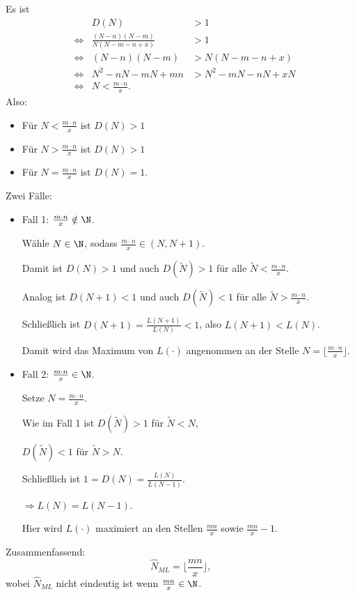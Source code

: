 \documentclass{tstextbook}
\begin{document}
\begin{example}
	Es ist 
	\[
	\begin{aligned}
		&& D(N) & > 1 \\
		& \Leftrightarrow & \frac{(N-n)(N-m)}{N(N-m-n+x)} & > 1 \\
		& \Leftrightarrow & (N-n)(N-m) & > N(N-m-n+x) \\
		& \Leftrightarrow & N^2-nN-mN+mn & > N^2-mN-nN+xN \\
		& \Leftrightarrow & N < \frac{m\cdot n}{x}.
	\end{aligned}
	\]
	Also: 
	\begin{itemize}
		\item Für $ N < \frac{m\cdot n}{x} $ ist $ D(N) > 1 $
		\item Für $ N > \frac{m\cdot n}{x} $ ist $ D(N) > 1 $
		\item Für $ N = \frac{m\cdot n}{x} $ ist $ D(N) = 1 $.
	\end{itemize}

Zwei Fälle:
	\begin{itemize}
		\item Fall 1: 
		$ \frac{m\cdot n}{x}\notin \N $. 
		
		Wähle $ N \in \N $, sodass $ \frac{m\cdot n}{x} \in (N, N+1) $. 
		
		Damit ist $ D(N) > 1 $ und auch $ D(\tilde{N}) > 1 $ für alle $ \tilde{N} < \frac{m\cdot n}{x} $. 
		
		Analog ist $ D(N+1) < 1 $ und auch $ D(\tilde{N}) < 1 $ für alle $ \tilde{N} > \frac{m\cdot n}{x} $.
		
		Schließlich ist $ D(N+1) = \frac{L(N+1)}{L(N)} < 1 $, also $ L(N+1) < L(N) $. 
		
		Damit wird das Maximum von $ L(\cdot) $ angenommen an der Stelle $ N = \lfloor\frac{m\cdot n}{x}\rfloor $.
		\item Fall 2: 
		$ \frac{m\cdot n}{x} \in \N $. 
		
		Setze $ N = \frac{m\cdot n}{x} $.
		
		Wie im Fall 1 ist $ D(\tilde{N}) > 1 $ für $ \tilde{N} < N $, 
		
		$ D(\tilde{N}) < 1 $ für $ \tilde{N} > N $.
		
		Schließlich ist $ 1 = D(N) = \frac{L(N)}{L(N-1)} $.
		
		$ \Rightarrow L(N) = L(N-1) $. 
		
		Hier wird $ L(\cdot) $ maximiert an den Stellen $ \frac{mn}{x} $ sowie $ \frac{mn}{x} -1 $. 
	\end{itemize}

	Zusammenfassend: 
	\[
	\hat{N}_{ML} = \lfloor\frac{mn}{x}\rfloor,
	\]
	wobei $ \hat{N}_{ML} $ nicht eindeutig ist wenn $ \frac{mn}{x} \in \N $.
\end{example}
\end{document}
